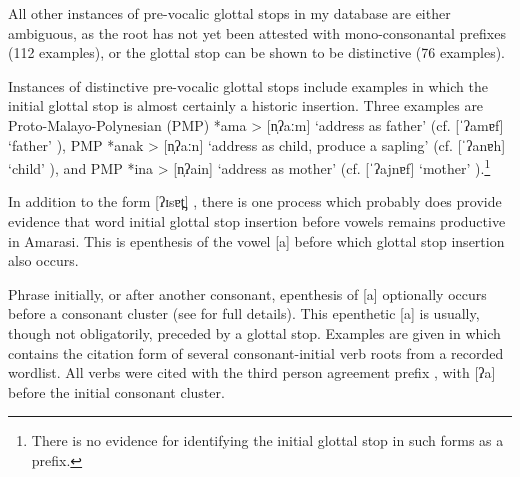 All other instances of pre-vocalic glottal stops in my database
are either ambiguous, as the root has not yet been attested
with mono-consonantal prefixes (112 examples),
or the glottal stop can be shown to be distinctive (76 examples).

Instances of distinctive pre-vocalic glottal stops include
examples in which the initial glottal stop is almost certainly a historic insertion.
Three examples are Proto-Malayo-Polynesian (PMP) *ama >  {\ra}  [n̩ʔaːm] {}
`address as father' (cf.  [ˈʔamɐf] `father' {}),
PMP *anak >  {\ra}  [n̩ʔaːn] {} `address as child, produce a sapling'
(cf.  [ˈʔanɐh] `child' {}),
and PMP *ina >  {\ra}  [n̩ʔain] {} `address as mother'
(cf.   [ˈʔajnɐf] `mother'  {}).\footnote{
		There is no evidence for identifying the initial glottal stop in such forms as a prefix.}

In addition to the form  [ʔɪsɐt̪] {},
there is one process which probably does provide evidence that word initial glottal
stop insertion before vowels remains productive in Amarasi.
This is epenthesis of the vowel [a]
before which glottal stop insertion also occurs.

Phrase initially, or after another consonant,
epenthesis of [a] optionally occurs before a
consonant cluster (see  for full details).
This epenthetic [a] is usually, though not obligatorily,
preceded by a glottal stop.
Examples are given in  which contains
the citation form of several consonant-initial verb roots from a recorded wordlist.
All verbs were cited with the third person agreement prefix ,
with [ʔa] before the initial consonant cluster.

